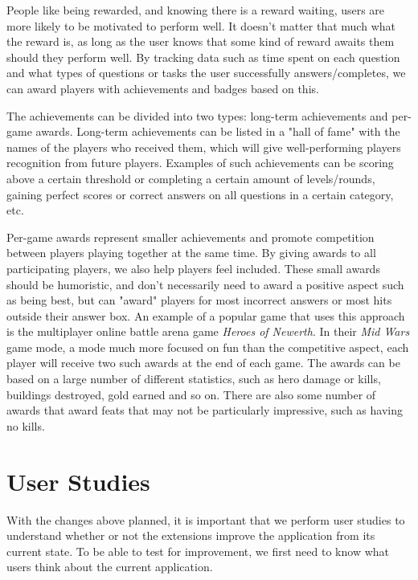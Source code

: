 People like being rewarded, and knowing there is a reward waiting, users are more likely to be motivated to perform well. It doesn't matter that much what the reward is, as long as the user knows that some kind of reward awaits them should they perform well. By tracking data such as time spent on each question and what types of questions or tasks the user successfully answers/completes, we can award players with achievements and badges based on this.

The achievements can be divided into two types: long-term achievements and per-game awards. Long-term achievements can be listed in a "hall of fame" with the names of the players who received them, which will give well-performing players recognition from future players. Examples of such achievements can be scoring above a certain threshold or completing a certain amount of levels/rounds, gaining perfect scores or correct answers on all questions in a certain category, etc.

Per-game awards represent smaller achievements and promote competition between players playing together at the same time. By giving awards to all participating players, we also help players feel included. These small awards should be humoristic, and don't necessarily need to award a positive aspect such as being best, but can "award" players for most incorrect answers or most hits outside their answer box. An example of a popular game that uses this approach is the multiplayer online battle arena game \emph{Heroes of Newerth}\citep{Newerth}. In their \emph{Mid Wars} game mode, a mode much more focused on fun than the competitive aspect, each player will receive two such awards at the end of each game. The awards can be based on a large number of different statistics, such as hero damage or kills, buildings destroyed, gold earned and so on\citep{MidWars}. There are also some number of awards that award feats that may not be particularly impressive, such as having no kills.


\section{User Studies}

With the changes above planned, it is important that we perform user studies to understand whether or not the extensions improve the application from its current state. To be able to test for improvement, we first need to know what users think about the current application.

